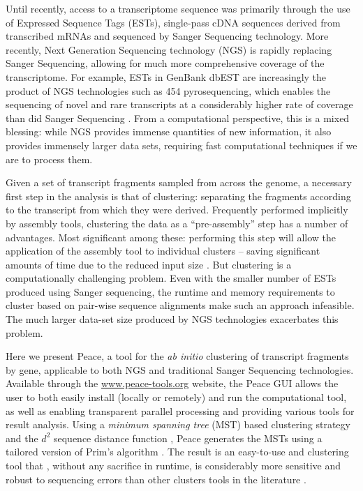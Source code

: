 \documentclass[a4,center,fleqn]{NAR}
\begin{document}
Until recently, access to a transcriptome sequence was primarily
through the use of Expressed Sequence Tags (ESTs), single-pass cDNA
sequences derived from transcribed mRNAs and sequenced by Sanger
Sequencing technology.  More recently, Next Generation Sequencing
technology (NGS) is rapidly replacing Sanger Sequencing, allowing for
much more comprehensive coverage of the transcriptome.  For example,
ESTs in GenBank dbEST are increasingly the product of NGS technologies
such as 454 pyrosequencing, which enables the sequencing of novel and
rare transcripts at a considerably higher rate of coverage than did
Sanger Sequencing \cite{Cheung2006,Emrich2007}.  From a computational
perspective, this is a mixed blessing: while NGS provides immense
quantities of new information, it also provides immensely larger data
sets, requiring fast computational techniques if we are to process
them.

Given a set of transcript fragments sampled from across the genome, a
necessary first step in the analysis is that of clustering: separating
the fragments according to the transcript from which they were
derived.  Frequently performed implicitly by assembly tools,
clustering the data as a ``pre-assembly'' step has a number of
advantages.  Most significant among these: performing this step will
allow the application of the assembly tool to individual clusters --
saving significant amounts of time due to the reduced input size
\cite{Hazelhurst08a}.  But clustering is a computationally challenging
problem.  Even with the smaller number of ESTs produced using Sanger
sequencing, the runtime and memory requirements to cluster based on
pair-wise sequence alignments make such an approach infeasible.  The
much larger data-set size produced by NGS 
technologies exacerbates this problem.

Here we present {\sc Peace}, a tool for the {\it ab initio} clustering
of transcript fragments by gene, applicable to both NGS and
traditional Sanger Sequencing technologies.  Available through the
\href{http://www.peace-tools.org}{www.peace-tools.org} website, the
{\sc Peace} GUI allows the user to both easily install (locally or remotely)
and run the computational tool, as well as enabling transparent
parallel processing and providing various tools for result analysis.
Using a {\it minimum spanning tree} (MST) based clustering strategy
\cite{Jain99,Wan08} and the $d^2$ sequence distance function
\cite{Hide94}, {\sc Peace} generates the MSTs using a tailored version
of Prim's algorithm \cite{Prim57}.  The result is an easy-to-use and
clustering tool that , without any sacrifice in runtime, is
considerably more sensitive and robust to sequencing errors than other
clusters tools in the literature \cite{Burke99,Slater00,
  Huang99,Parkinson02,Kalyanaraman03,Malde03,Ptitsyn05,Hazelhurst08a, Picardi09}.
\end{document}
